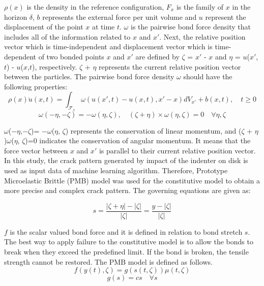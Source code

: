  $\rho(x)$ is the density in the reference configuration, $F_x$ is the family of $x$ in the horizon $\delta$, $b$ represents the external force per unit volume and $u$ represent the displacement of the point $x$ at time $t$. $\omega$ is the pairwise bond force density that includes all of the information related to $x$ and ${x'}$. Next, the relative position vector which is time-independent and displacement vector which is time-dependent of two bonded points $x$ and ${x'}$ are defined by $\zeta$ = ${x'}$ - $x$ and $\eta$ = $u$(${x'}$,$t$) - $u$($x$,$t$), respectively. $\zeta$ + $\eta$ represents the current relative position vector between the particles. The pairwise bond force density $\omega$ should have the following properties: 
\begin{equation}
\rho(x)\ddot{u}(x,t)=\int_{\mathcal{F}_x} \omega(u(x',t)-u(x,t),x'-x)dV_{x'}+b(x,t), \quad t\geq0
\end{equation}
\begin{equation}
\omega(-\eta,-\zeta)= -\omega(\eta, \zeta),\quad(\zeta + \eta)\times\omega(\eta, \zeta)=0 \quad\forall\eta,\zeta
\end{equation}




$\omega$($-\eta$,$-\zeta$)= $-\omega$($\eta$, $\zeta$) represents the conservation of linear momentum, and ($\zeta$ + $\eta$)\times$\omega$($\eta$, $\zeta$)=0 indicates the conservation of angular momentum. It means that the force vector between $x$ and ${x'}$ is parallel to their current relative position vector. In this study, the crack pattern generated by impact of the indenter on disk is used as input data of machine learning algorithm. Therefore, Prototype Microelastic Brittle (PMB) model \cite{Ref4} was used for the constitutive model to obtain a more precise and complex crack pattern. The governing equations are given as: 

\begin{equation}
s=\frac{|\zeta+\eta|-|\zeta|}{|\zeta|}=\frac{y-|\zeta|}{|\zeta|}
\end{equation}

$f$ is the scalar valued bond force and it is defined in relation to bond stretch $s$. The best way to apply failure to the constitutive model is to allow the bonds to break when they exceed the predefined limit. If the bond is broken, the tensile strength cannot be restored. The PMB model is defined as follows.
\begin{equation}
f(y(t),\zeta)=g(s(t,\zeta))\mu(t,\zeta)
\end{equation}
\begin{equation}
g(s)=cs \quad\forall s
\end{equation}

